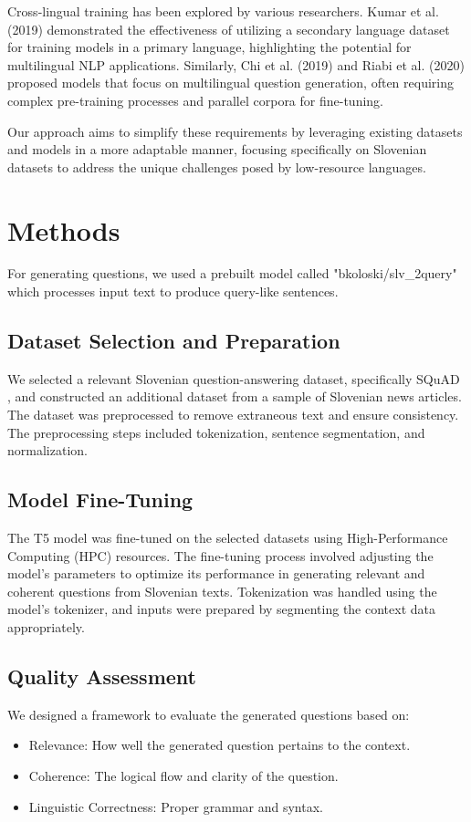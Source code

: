 \documentclass[fleqn,moreauthors,10pt]{ds_report}
\begin{document}
Cross-lingual training has been explored by various researchers. Kumar et al. (2019) \cite{kumar2019cross} demonstrated the effectiveness of utilizing a secondary language dataset for training models in a primary language, highlighting the potential for multilingual NLP applications. Similarly, Chi et al. (2019) \cite{chi2019cross} and Riabi et al. (2020) \cite{riabi2020multilingual} proposed models that focus on multilingual question generation, often requiring complex pre-training processes and parallel corpora for fine-tuning.

Our approach aims to simplify these requirements by leveraging existing datasets and models in a more adaptable manner, focusing specifically on Slovenian datasets to address the unique challenges posed by low-resource languages.



\section*{Methods}
For generating questions, we used a prebuilt model called "bkoloski/slv\_2query" which processes input text to produce query-like sentences.

\subsection*{Dataset Selection and Preparation}
We selected a relevant Slovenian question-answering dataset, specifically SQuAD \cite{rajpurkar2016squad}, and constructed an additional dataset from a sample of Slovenian news articles. The dataset was preprocessed to remove extraneous text and ensure consistency. The preprocessing steps included tokenization, sentence segmentation, and normalization.

\subsection*{Model Fine-Tuning}
The T5 model \cite{raffel2020exploring} was fine-tuned on the selected datasets using High-Performance Computing (HPC) resources. The fine-tuning process involved adjusting the model’s parameters to optimize its performance in generating relevant and coherent questions from Slovenian texts. Tokenization was handled using the model’s tokenizer, and inputs were prepared by segmenting the context data appropriately.

\subsection*{Quality Assessment}
We designed a framework to evaluate the generated questions based on:
\begin{itemize}[noitemsep]
    \item Relevance: How well the generated question pertains to the context.
    \item Coherence: The logical flow and clarity of the question.
    \item Linguistic Correctness: Proper grammar and syntax.
\end{itemize}
\end{document}

